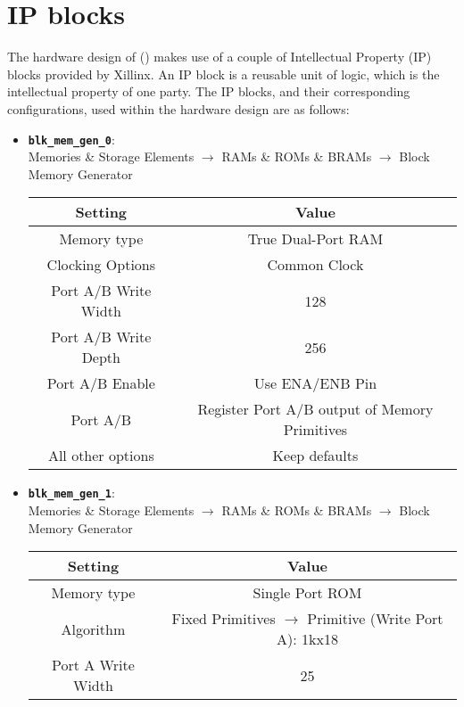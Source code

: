 
\section{IP blocks} \label{sec: IP Blocks}
The hardware design of {\fourq} \cite{jarvinen2016four} () makes use of a couple of Intellectual Property (IP) blocks provided by Xillinx.
An IP block is a reusable unit of logic, which is the intellectual property of one party.
The IP blocks, and their corresponding configurations, used within the {\fourq} hardware design are as follows:
%
\begin{itemize}
	\item \textbf{\texttt{blk_mem_gen_0}}: \\ Memories \& Storage Elements $\to$ RAMs \& ROMs \& BRAMs $\to$ Block Memory Generator
	\begin{table}[H]
		\centering
		\begin{tabular}{cc}
			\toprule
			\textbf{Setting} & \textbf{Value} \\
			\midrule
			Memory type & True Dual-Port RAM \\
			Clocking Options & Common Clock \\
			Port A/B Write Width & 128 \\
			Port A/B Write Depth & 256 \\
			Port A/B Enable & Use ENA/ENB Pin \\
			Port A/B & Register Port A/B output of Memory Primitives \\
			All other options & Keep defaults \\
			\bottomrule
		\end{tabular}
	\end{table}
	\item \textbf{\texttt{blk_mem_gen_1}}: \\ Memories \& Storage Elements $\to$ RAMs \& ROMs \& BRAMs $\to$ Block Memory Generator
	\begin{table}[H]
		\centering
		\begin{tabular}{cc}
			\toprule
			\textbf{Setting} & \textbf{Value} \\
			\midrule
			Memory type &  Single Port ROM\\
			Algorithm & Fixed Primitives $\to$ Primitive (Write Port A): 1kx18 \\
			Port A Write Width & 25 \\

\end{tabular}
\end{table}
\end{itemize}
